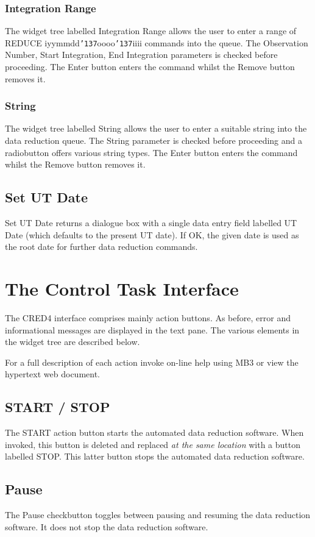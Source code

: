 \documentclass[a4paper]{book}
\renewcommand{\_}{{\tt\char'137}}
\begin{document}
\subsubsection{Integration Range}
The widget tree labelled {\sf Integration Range} allows the user to enter a range
of REDUCE iyymmdd\_oooo\_iiii commands into the queue.
The {\sf Observation Number, Start Integration, End Integration} parameters
is checked before proceeding. The {\sf Enter} button enters the command whilst the
{\sf Remove} button removes it. 

\subsubsection{String}
The widget tree labelled {\sf String} allows the user to enter a suitable
string into the data reduction queue. The {\sf String} parameter
is checked before proceeding and a radiobutton offers various string types. 
The {\sf Enter} button enters the command whilst the {\sf Remove} button removes it. 

\subsection{Set UT Date}
{\sf Set UT Date} returns a dialogue box with a single data entry field labelled {\sf UT Date} 
(which defaults to the present UT date). If {\sf OK}, the given date is used as the root
date for further data reduction commands.

\section{The Control Task Interface}
The CRED4 interface comprises mainly action buttons.
As before, error and informational messages are displayed in the text pane.
The various elements in the widget tree are described below.

For a full description of each action invoke on-line help using MB3 or view the hypertext web document.

\subsection{START / STOP}
The {\sf START} action button starts the
automated data reduction software. When invoked, this button is deleted and replaced
{\em at the same location} with a button labelled {\sf STOP}. This latter
button stops the automated data reduction software. 

\subsection{Pause}
The {\sf Pause} checkbutton toggles between pausing and resuming the
data reduction software. It does not stop the data reduction software.
\end{document}
